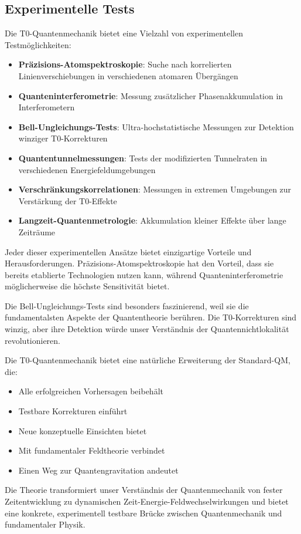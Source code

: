 \documentclass[12pt,a4paper]{article}
\theoremstyle{definition}
\theoremstyle{remark}
\begin{document}
\subsection{Experimentelle Tests}

Die T0-Quantenmechanik bietet eine Vielzahl von experimentellen Testmöglichkeiten:

\begin{itemize}
	\item \textbf{Präzisions-Atomspektroskopie}: Suche nach korrelierten Linienverschiebungen in verschiedenen atomaren Übergängen
	\item \textbf{Quanteninterferometrie}: Messung zusätzlicher Phasenakkumulation in Interferometern
	\item \textbf{Bell-Ungleichungs-Tests}: Ultra-hochstatistische Messungen zur Detektion winziger T0-Korrekturen
	\item \textbf{Quantentunnelmessungen}: Tests der modifizierten Tunnelraten in verschiedenen Energiefeldumgebungen
	\item \textbf{Verschränkungskorrelationen}: Messungen in extremen Umgebungen zur Verstärkung der T0-Effekte
	\item \textbf{Langzeit-Quantenmetrologie}: Akkumulation kleiner Effekte über lange Zeiträume
\end{itemize}

Jeder dieser experimentellen Ansätze bietet einzigartige Vorteile und Herausforderungen. Präzisions-Atomspektroskopie hat den Vorteil, dass sie bereits etablierte Technologien nutzen kann, während Quanteninterferometrie möglicherweise die höchste Sensitivität bietet.

Die Bell-Ungleichungs-Tests sind besonders faszinierend, weil sie die fundamentalsten Aspekte der Quantentheorie berühren. Die T0-Korrekturen sind winzig, aber ihre Detektion würde unser Verständnis der Quantennichtlokalität revolutionieren.

\begin{tcolorbox}[colback=green!5!white,colframe=green!75!black,title=Schlussfolgerung]
	Die T0-Quantenmechanik bietet eine natürliche Erweiterung der Standard-QM, die:
	\begin{itemize}
		\item Alle erfolgreichen Vorhersagen beibehält
		\item Testbare Korrekturen einführt
		\item Neue konzeptuelle Einsichten bietet
		\item Mit fundamentaler Feldtheorie verbindet
		\item Einen Weg zur Quantengravitation andeutet
	\end{itemize}
	
	Die Theorie transformiert unser Verständnis der Quantenmechanik von fester Zeitentwicklung zu dynamischen Zeit-Energie-Feldwechselwirkungen und bietet eine konkrete, experimentell testbare Brücke zwischen Quantenmechanik und fundamentaler Physik.
\end{tcolorbox}
\end{document}
